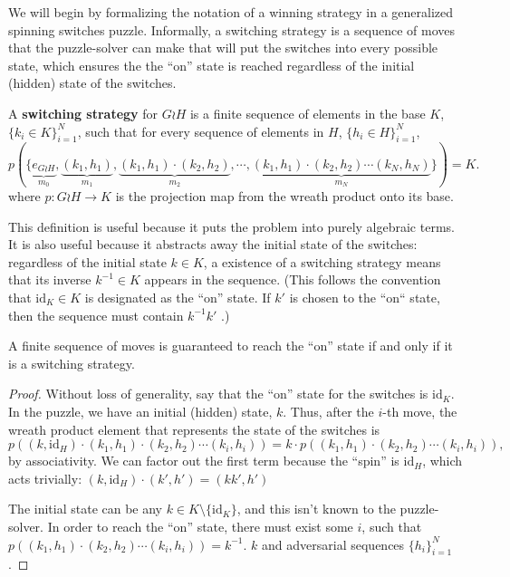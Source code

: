 We will begin by formalizing the notation of a winning strategy in a
generalized spinning switches puzzle. Informally, a switching strategy is
a sequence of moves that the puzzle-solver can make that will put the switches
into every possible state, which ensures the the ``on'' state is reached
regardless of the initial (hidden) state of the switches.

\begin{definition}
  A \textbf{switching strategy} for $G \wr H$ is a finite sequence of elements
  in the base $K$,
  $\{k_i \in K\}_{i=1}^N$,
  such that for every sequence of elements in $H$, ${\{h_i \in H\}_{i=1}^N}$,
  \begin{equation}
    p(\{
      \underbrace{e_{G \wr H}}_{m_0},
      \underbrace{(k_1, h_1)}_{m_1},
      \underbrace{(k_1, h_1)\cdot(k_2, h_2)}_{m_2},
      \cdots,
      \underbrace{(k_1, h_1)\cdot(k_2, h_2)\cdots(k_N, h_N)}_{m_N}
    \}) = K.
  \end{equation}
  where $p \colon G \wr H \rightarrow K$ is the projection map from the
  wreath product onto its base.
\label{def:switchingStrategy}
\end{definition}

This definition is useful because it puts the problem into purely algebraic
terms. It is also useful because it abstracts away the initial state of the
switches: regardless of the initial state $k \in K$, a existence of a switching strategy
means that its inverse $k^{-1} \in K$ appears in the sequence.
(This follows the convention that $\mathrm{id}_K \in K$ is designated as the
``on'' state. If $k'$ is chosen to the ``on`` state, then the sequence
must contain $k^{-1}k'$ .)

\begin{proposition}
  A finite sequence of moves is guaranteed to reach the ``on''
  state if and only if it is a switching strategy.
\end{proposition}
\begin{proof}
  Without loss of generality, say that the ``on'' state for the switches is
  $\mathrm{id}_K$.
  In the puzzle, we have an initial (hidden) state, $k$.
  Thus, after the $i$-th move, the wreath product
  element that represents the state of the switches is \begin{equation}
    p\left((k, \mathrm{id}_H)\cdot(k_1, h_1)\cdot(k_2, h_2)\cdots(k_i, h_i)\right)
    = k \cdot p\left((k_1, h_1)\cdot(k_2, h_2)\cdots(k_i, h_i)\right),
  \end{equation} by associativity. We can factor out the first term because
  the ``spin'' is $\mathrm{id}_H$, which acts trivially:
  ${(k, \mathrm{id}_H) \cdot (k', h') = (kk', h')}$

  The initial state can be any $k \in K \setminus \{\mathrm{id}_K\}$,
  and this isn't known to the puzzle-solver.
  In order to reach the ``on'' state, there must exist some $i$, such that
  $p\left((k_1, h_1)\cdot(k_2, h_2)\cdots(k_i, h_i)\right) = k^{-1}$.
  $k$ and adversarial sequences $\{h_i\}_{i=1}^N$.
\end{proof}

